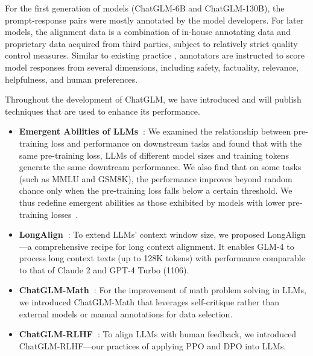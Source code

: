 For the first generation of models (ChatGLM-6B and ChatGLM-130B), the prompt-response pairs were mostly annotated by the model developers. 
For later models, the alignment data is a combination of in-house annotating data and proprietary data acquired from third parties, subject to relatively strict quality control measures. 
Similar to existing practice \cite{touvron2023llama2}, annotators are instructed to score model responses from several dimensions, including safety, factuality, relevance, helpfulness, and human preferences. 







Throughout the development of ChatGLM, we have introduced and will publish techniques that are used to enhance its performance. 
\begin{itemize}[leftmargin=*,itemsep=0pt,parsep=0.2em,topsep=0.0em,partopsep=0.0em]

\item \textbf{Emergent Abilities of LLMs~\cite{du2024understanding}}: 
We examined the relationship between pre-training loss and performance on downstream tasks and found that with the same pre-training loss, LLMs of different model sizes and training tokens generate the same downtream performance. We also find that on some tasks (such as MMLU and GSM8K), the performance improves beyond random chance only when the pre-training loss falls below a certain threshold.
We thus redefine emergent abilities as those exhibited by models with lower pre-training losses~\cite{du2024understanding}.

\item \textbf{LongAlign~\cite{bai2024longalign}}: 
To extend LLMs' context window size, we proposed LongAlign---a comprehensive recipe for long context alignment. 
It enables GLM-4 to process long context texts (up to 128K tokens) with performance comparable to that of Claude 2 and GPT-4 Turbo (1106). 

\item \textbf{ChatGLM-Math~\cite{xu2024chatglmmath}}: 
For the improvement of math problem solving in LLMs, we introduced ChatGLM-Math that leverages self-critique rather than external models or manual annotations for data selection. 

\item \textbf{ChatGLM-RLHF~\cite{hou2024chatglmrlhf}}: 
To align LLMs with human feedback, we introduced ChatGLM-RLHF---our practices of applying PPO and DPO into LLMs. 


\end{itemize}
